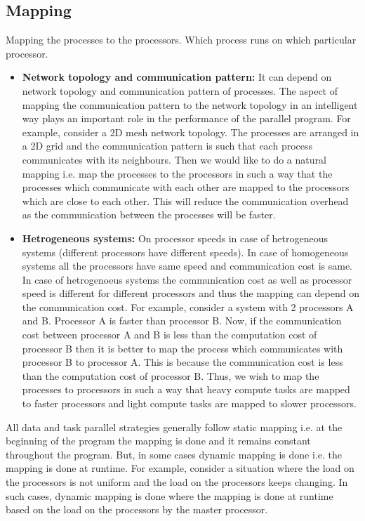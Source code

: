 \documentclass[12pt]{article}
\begin{document}
\subsection{Mapping}
Mapping the processes to the processors. 
Which process runs on which particular processor.
\begin{itemize}
    \item \textbf{Network topology and communication pattern: }It can depend on network topology and communication pattern of processes. The aspect of mapping the communication pattern to the network topology in an intelligent way plays an important role in the performance of the parallel program.
          For example, consider a 2D mesh network topology. The processes are arranged in a 2D grid and the communication pattern is such that each process communicates with its neighbours. Then we would like to do a natural mapping i.e. map the 
            processes to the processors in such a way that the processes which communicate with each other are mapped to the processors which are close to each other. This will reduce the communication overhead as the communication between the processes will be faster.
          
    \item \textbf{Hetrogeneous systems: }On processor speeds in case of hetrogeneous systems (different processors have different speeds). In case of homogeneous systems all the processors have same speed and communication cost is same.
          In case of hetrogenoeus systems the communication cost as well as processor speed is different for different processors and thus the mapping can depend on the communication cost. For example, consider a system with 2 processors A and B. Processor A is faster than processor B.
            Now, if the communication cost between processor A and B is less than the computation cost of processor B then it is better to map the process which communicates with processor B to processor A. This is because the communication cost is less than the computation cost of processor B. Thus, we wish to map the processes 
            to processors in such a way that heavy compute tasks are mapped to faster processors and light compute tasks are mapped to slower processors.
\end{itemize}
All data and task parallel strategies generally follow static mapping i.e. at the beginning of the program the mapping is done and it remains constant throughout the program.
But, in some cases dynamic mapping is done i.e. the mapping is done at runtime. For example, consider a situation where the load on the processors is not uniform and the load on the processors keeps changing. In such cases, dynamic mapping is done where the mapping is done at runtime based on the load on the processors by the master processor.
\end{document}
